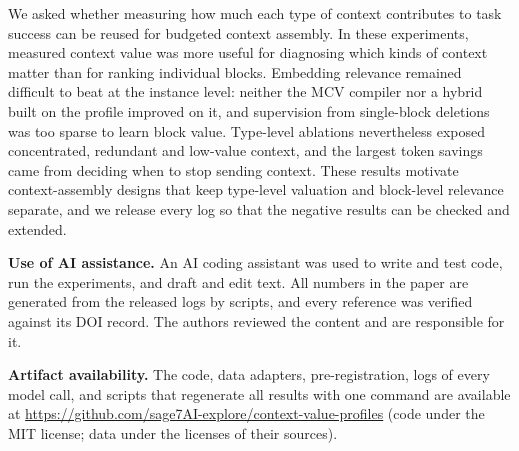 We asked whether measuring how much each type of context contributes to task success can be reused for budgeted
context assembly. In these experiments, measured context value was more useful for diagnosing which kinds of context
matter than for ranking individual blocks. Embedding relevance remained difficult to beat at the instance level: neither
the MCV compiler nor a hybrid built on the profile improved on it, and supervision from single-block deletions was too
sparse to learn block value. Type-level ablations nevertheless exposed concentrated, redundant and low-value context,
and the largest token savings came from deciding when to stop sending context. These results motivate context-assembly
designs that keep type-level valuation and block-level relevance separate, and we release every log so that the
negative results can be checked and extended.

\textbf{Use of AI assistance.} An AI coding assistant was used to write and test code, run the experiments, and draft
and edit text. All numbers in the paper are generated from the released logs by scripts, and every reference was
verified against its DOI record. The authors reviewed the content and are responsible for it.

\textbf{Artifact availability.} The code, data adapters, pre-registration, logs of every model call, and scripts that
regenerate all results with one command are available at
\url{https://github.com/sage7AI-explore/context-value-profiles} (code under the MIT license; data under the licenses of
their sources).
